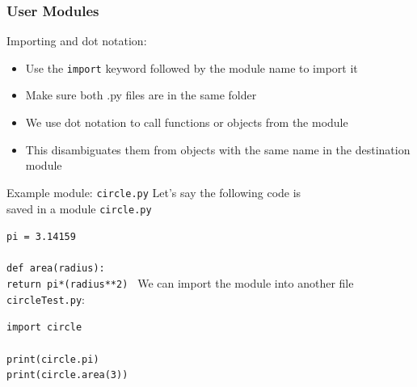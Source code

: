\documentclass{beamer}
\newcommand{\code}[1]{\texttt{#1}}
\newcommand{\tab}{\hspace*{22pt}}
\begin{document}
\begin{frame}	
	\frametitle{User Modules}
	
	\begin{block}{Importing and dot notation:}
		\begin{itemize}
			\item Use the \code{import} keyword followed by the module name to import it
			\item Make sure both .py files are in the same folder
			\item We use dot notation to call functions or objects from the module
			\item This disambiguates them from objects with the same name in the destination module
		\end{itemize}
	\end{block}
	
	\begin{block}{Example module: \code{circle.py}}
			Let's say the following code is \\ saved in a module \code{circle.py}
			
			\vspace{10pt}
			\code{pi = 3.14159 \\
			\tab \\
			def area(radius): \\
				\tab return pi*(radius**2)
			}
		\endminipage\hfill
			We can import the module into another file \code{circleTest.py}:
			
			\vspace{10pt}
			\code{import circle \\
			\tab \\
			print(circle.pi) \\
			print(circle.area(3))
			}
		\endminipage\hfill
	\end{block}
	
\end{frame}
\end{document}
